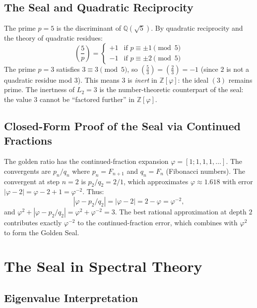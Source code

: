 \subsection{The Seal and Quadratic Reciprocity}

The prime $p = 5$ is the discriminant of $\mathbb{Q}(\sqrt5)$.
By quadratic reciprocity and the theory of quadratic residues:
\[
  \left(\frac{5}{p}\right) = \begin{cases}
    +1 & \text{if } p \equiv \pm 1 \pmod{5} \\
    -1 & \text{if } p \equiv \pm 2 \pmod{5}
  \end{cases}
\]
The prime $p = 3$ satisfies $3 \equiv 3 \pmod 5$, so
$\left(\frac{5}{3}\right) = \left(\frac{2}{3}\right) = -1$
(since $2$ is not a quadratic residue mod $3$).  This means
$3$ is \emph{inert} in $\mathbb{Z}[\varphi]$: the ideal $(3)$
remains prime.  The inertness of $L_2 = 3$ is the
number-theoretic counterpart of the seal: the value $3$
cannot be ``factored further'' in $\mathbb{Z}[\varphi]$.

\subsection{Closed-Form Proof of the Seal via Continued Fractions}

The golden ratio has the continued-fraction expansion
$\varphi = [1; 1, 1, 1, \ldots]$.  The convergents are
$p_n/q_n$ where $p_n = F_{n+1}$ and $q_n = F_n$ (Fibonacci
numbers).  The convergent at step $n = 2$ is $p_2/q_2 = 2/1$,
which approximates $\varphi \approx 1.618$ with error
$|\varphi - 2| = \varphi - 2 + 1 = \varphi^{-2}$.  Thus:
\[
  |\varphi - p_2/q_2|
  = |\varphi - 2| = 2 - \varphi = \varphi^{-2},
\]
and $\varphi^2 + |\varphi - p_2/q_2| = \varphi^2 + \varphi^{-2} = 3$.
The best rational approximation at depth $2$ contributes
exactly $\varphi^{-2}$ to the continued-fraction error, which
combines with $\varphi^2$ to form the Golden Seal.

\section{The Seal in Spectral Theory}
\label{sec:gs-spectral}

\subsection{Eigenvalue Interpretation}

